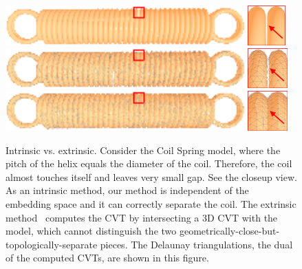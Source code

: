 \begin{figure}[htbp]
\centering
\includegraphics[height=0.6in]{figs/cvt/spring_origin_2.png}
\includegraphics[height=0.6in]{figs/cvt/spring_origin_closeup.png}
\includegraphics[height=0.6in]{figs/cvt/spring_ours_2.png}
\includegraphics[height=0.6in]{figs/cvt/spring_ours_closeup.png}
\includegraphics[height=0.6in]{figs/cvt/spring_yan_2.png}
\includegraphics[height=0.6in]{figs/cvt/spring_yan_closeup.png}
\caption{Intrinsic vs. extrinsic. Consider the Coil Spring model,
where the pitch of the helix equals the diameter of the coil.
Therefore, the coil almost touches itself and leaves very small gap.
See the closeup view. As an intrinsic method, our method is
independent of the embedding space and it can correctly separate the
coil. The extrinsic method~\cite{DBLP:journals/cgf/YanLLSW09}
computes the CVT by intersecting a 3D CVT with the model, which
cannot distinguish the two
geometrically-close-but-topologically-separate pieces. The Delaunay
triangulations, the dual of the computed CVTs, are shown in this
figure.} \label{fig:spring}
\end{figure}

